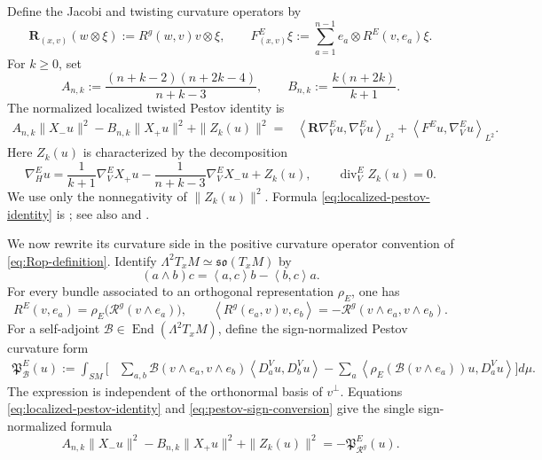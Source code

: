 \documentclass[reqno,11pt]{amsart}
\theoremstyle{definition}
\newcommand{\SM}{SM}
\newcommand{\Rop}{\mathscr R}
\newcommand{\cB}{\mathcal B}
\newcommand{\End}{\operatorname{End}}
\newcommand{\inner}[2]{\left\langle #1,#2\right\rangle}
\begin{document}
Define the Jacobi and twisting curvature operators by
\begin{equation*}
  \mathbf R_{(x,v)}(w\otimes\xi)
  :=R^g(w,v)v\otimes\xi,
  \qquad
  F^E_{(x,v)}\xi
  :=\sum_{a=1}^{n-1}e_a\otimes R^E(v,e_a)\xi.
\end{equation*}
For $k\geq0$, set
\begin{equation*}
  A_{n,k}:=\frac{(n+k-2)(n+2k-4)}{n+k-3},
  \qquad
  B_{n,k}:=\frac{k(n+2k)}{k+1}.
\end{equation*}
The normalized localized twisted Pestov identity is
\begin{equation}\label{eq:localized-pestov-identity}
\begin{split}
  A_{n,k}\|X_-u\|^2-B_{n,k}\|X_+u\|^2+\|Z_k(u)\|^2
  ={}&\inner{\mathbf R\nabla_V^Eu}{\nabla_V^Eu}_{L^2}+\inner{F^Eu}{\nabla_V^Eu}_{L^2}.
\end{split}
\end{equation}
Here $Z_k(u)$ is characterized by the decomposition
\begin{equation*}
  \nabla_H^Eu
  =\frac1{k+1}\nabla_V^EX_+u
   -\frac1{n+k-3}\nabla_V^EX_-u+Z_k(u),
  \qquad \operatorname{div}_V^E Z_k(u)=0.
\end{equation*}
We use only the nonnegativity of $\|Z_k(u)\|^2$.  Formula
\eqref{eq:localized-pestov-identity} is
\cite[Lemma~2.3]{CLMS24}; see also
\cite[Proposition~3.5]{GPSU16} and
\cite[Proposition~6.2]{CLMSW25}.

We now rewrite its curvature side in the positive curvature operator
convention of \eqref{eq:Rop-definition}.  Identify
$\Lambda^2T_xM\simeq\mathfrak{so}(T_xM)$ by
\begin{equation}\label{eq:wedge-skew-convention}
  (a\wedge b)c=\inner{a}{c}b-\inner{b}{c}a.
\end{equation}
For every bundle associated to an orthogonal representation $\rho_E$, one has
\begin{equation}\label{eq:pestov-sign-conversion}
  R^E(v,e_a)=\rho_E\bigl(\Rop^g(v\wedge e_a)\bigr),
  \qquad
  \inner{R^g(e_a,v)v}{e_b}
  =-\Rop^g(v\wedge e_a,v\wedge e_b).
\end{equation}
For a self-adjoint $\cB\in\End(\Lambda^2T_xM)$, define the sign-normalized
Pestov curvature form
\begin{equation}\label{eq:sign-normalized-pestov-form}
\begin{split}
  \mathfrak P_{\cB}^E(u):=\int_{\SM}\bigg[{}
  &\sum_{a,b}\cB(v\wedge e_a,v\wedge e_b)
       \inner{D_a^Vu}{D_b^Vu}-\sum_a\inner{\rho_E(\cB(v\wedge e_a))u}{D_a^Vu}
  \bigg]d\mu.
\end{split}
\end{equation}
The expression is independent of the orthonormal basis of $v^\perp$.
Equations \eqref{eq:localized-pestov-identity} and
\eqref{eq:pestov-sign-conversion} give the single sign-normalized formula
\begin{equation}\label{eq:localized-pestov-positive}
  A_{n,k}\|X_-u\|^2-B_{n,k}\|X_+u\|^2+\|Z_k(u)\|^2
  =-\mathfrak P_{\Rop^g}^E(u).
\end{equation}
\end{document}
